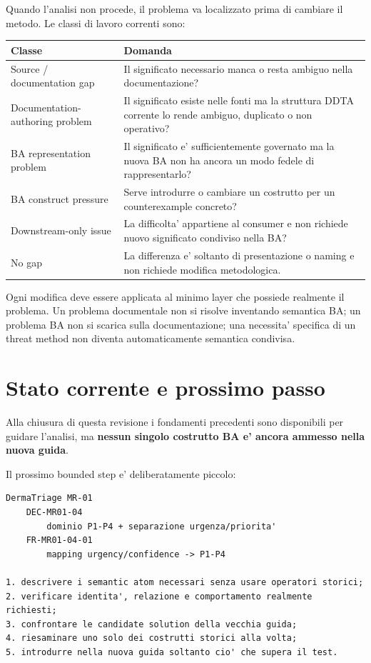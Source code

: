 \documentclass[11pt,a4paper]{article}
\begin{document}
Quando l'analisi non procede, il problema va localizzato prima di cambiare il metodo. Le classi di lavoro correnti sono:

\begin{tabularx}{\textwidth}{L{46mm}Y}
\toprule
\textbf{Classe} & \textbf{Domanda} \\
\midrule
Source / documentation gap & Il significato necessario manca o resta ambiguo nella documentazione? \\
Documentation-authoring problem & Il significato esiste nelle fonti ma la struttura DDTA corrente lo rende ambiguo, duplicato o non operativo? \\
BA representation problem & Il significato e' sufficientemente governato ma la nuova BA non ha ancora un modo fedele di rappresentarlo? \\
BA construct pressure & Serve introdurre o cambiare un costrutto per un counterexample concreto? \\
Downstream-only issue & La difficolta' appartiene al consumer e non richiede nuovo significato condiviso nella BA? \\
No gap & La differenza e' soltanto di presentazione o naming e non richiede modifica metodologica. \\
\bottomrule
\end{tabularx}

\begin{ddtacore}[title={Minimum owning layer}]
Ogni modifica deve essere applicata al minimo layer che possiede realmente il problema. Un problema documentale non si risolve inventando semantica BA; un problema BA non si scarica sulla documentazione; una necessita' specifica di un threat method non diventa automaticamente semantica condivisa.
\end{ddtacore}

\section{Stato corrente e prossimo passo}

Alla chiusura di questa revisione i fondamenti precedenti sono disponibili per guidare l'analisi, ma \textbf{nessun singolo costrutto BA e' ancora ammesso nella nuova guida}.

Il prossimo bounded step e' deliberatamente piccolo:

\begin{lstlisting}
DermaTriage MR-01
    DEC-MR01-04
        dominio P1-P4 + separazione urgenza/priorita'
    FR-MR01-04-01
        mapping urgency/confidence -> P1-P4

1. descrivere i semantic atom necessari senza usare operatori storici;
2. verificare identita', relazione e comportamento realmente richiesti;
3. confrontare le candidate solution della vecchia guida;
4. riesaminare uno solo dei costrutti storici alla volta;
5. introdurre nella nuova guida soltanto cio' che supera il test.
\end{lstlisting}
\end{document}

